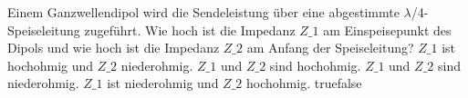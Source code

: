     {Einem Ganzwellendipol wird die Sendeleistung über eine abgestimmte $\lambda$/4-Speiseleitung zugeführt. Wie hoch ist die Impedanz $Z\_1$ am Einspeisepunkt des Dipols und wie hoch ist die Impedanz $Z\_2$ am Anfang der Speiseleitung?}
    {$Z\_1$ ist hochohmig und $Z\_2$ niederohmig.}
    {$Z\_1$ und $Z\_2$ sind hochohmig.}
    {$Z\_1$ und $Z\_2$ sind niederohmig.}
    {$Z\_1$ ist niederohmig und $Z\_2$ hochohmig.}
    {true}{false}